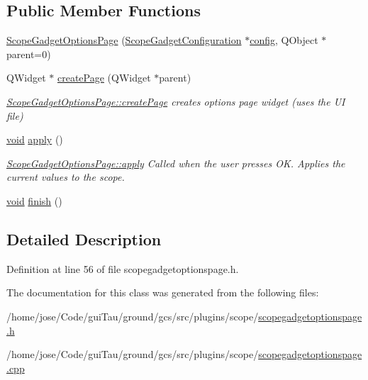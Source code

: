 \subsection*{Public Member Functions}
\begin{DoxyCompactItemize}
\item 
\hyperlink{group___scope_plugin_ga3680539fc8bb7716884d7e3da9caff3a}{Scope\-Gadget\-Options\-Page} (\hyperlink{class_scope_gadget_configuration}{Scope\-Gadget\-Configuration} $\ast$\hyperlink{deflate_8c_a4473b5227787415097004fd39f55185e}{config}, Q\-Object $\ast$parent=0)
\item 
Q\-Widget $\ast$ \hyperlink{group___scope_plugin_ga4032bc264c49c13a4bf81d5835a33206}{create\-Page} (Q\-Widget $\ast$parent)
\begin{DoxyCompactList}\small\item\em \hyperlink{group___scope_plugin_ga4032bc264c49c13a4bf81d5835a33206}{Scope\-Gadget\-Options\-Page\-::create\-Page} creates options page widget (uses the U\-I file) \end{DoxyCompactList}\item 
\hyperlink{group___u_a_v_objects_plugin_ga444cf2ff3f0ecbe028adce838d373f5c}{void} \hyperlink{group___scope_plugin_gaf046ff419274a440bbca457fd018c3e1}{apply} ()
\begin{DoxyCompactList}\small\item\em \hyperlink{group___scope_plugin_gaf046ff419274a440bbca457fd018c3e1}{Scope\-Gadget\-Options\-Page\-::apply} Called when the user presses O\-K. Applies the current values to the scope. \end{DoxyCompactList}\item 
\hyperlink{group___u_a_v_objects_plugin_ga444cf2ff3f0ecbe028adce838d373f5c}{void} \hyperlink{group___scope_plugin_ga106935101fc319a034138e2c37c02f8c}{finish} ()
\end{DoxyCompactItemize}


\subsection{Detailed Description}


Definition at line 56 of file scopegadgetoptionspage.\-h.



The documentation for this class was generated from the following files\-:\begin{DoxyCompactItemize}
\item 
/home/jose/\-Code/gui\-Tau/ground/gcs/src/plugins/scope/\hyperlink{scopegadgetoptionspage_8h}{scopegadgetoptionspage.\-h}\item 
/home/jose/\-Code/gui\-Tau/ground/gcs/src/plugins/scope/\hyperlink{scopegadgetoptionspage_8cpp}{scopegadgetoptionspage.\-cpp}\end{DoxyCompactItemize}
